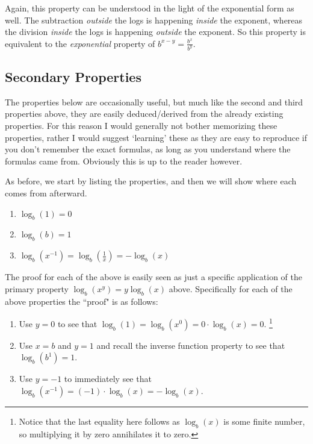 \documentclass{ximeraXloud}
\begin{document}
        Again, this property can be understood in the light of the exponential form as well. The subtraction \textit{outside} the logs is happening \textit{inside} the exponent, whereas the division \textit{inside} the logs is happening \textit{outside} the exponent. So this property is equivalent to the \textit{exponential} property of $b^{x-y}=\frac{b^x}{b^y}$.

\subsection*{Secondary Properties}

    The properties below are occasionally useful, but much like the second and third properties above, they are easily deduced/derived from the already existing properties. For this reason I would generally not bother memorizing these properties, rather I would suggest `learning' these as they are easy to reproduce if you don't remember the exact formulas, as long as you understand where the formulas came from. Obviously this is up to the reader however.
    
    As before, we start by listing the properties, and then we will show where each comes from afterward.
    
    \begin{enumerate}
        \item $\log_b(1) = 0$
        \item $\log_b(b) = 1$
        \item $\log_b\left(x^{-1}\right) = \log_b\left(\frac{1}{x}\right) = -\log_b(x)$
    \end{enumerate}
    
    The proof for each of the above is easily seen as just a specific application of the primary property $\log_b\left(x^y\right) = y\log_b(x)$ above. Specifically for each of the above properties the ``proof" is as follows:
    
    \begin{enumerate}
        \item Use $y=0$ to see that $\log_b(1) = \log_b\left(x^0\right) = 0 \cdot \log_b(x) = 0$.%
        \footnote{Notice that the last equality here follows as $\log_b(x)$ is some finite number, so multiplying it by zero annihilates it to zero.}
        \item Use $x = b$ and $y = 1$ and recall the inverse function property to see that $\log_b\left(b^1\right) = 1$.
        \item Use $y = -1$ to immediately see that $\log_b\left(x^{-1}\right) = (-1)\cdot \log_b (x) = -\log_b(x)$.
    \end{enumerate}
    
\end{document}
